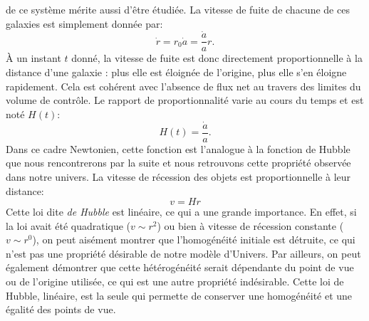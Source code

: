  de ce système mérite aussi d'être étudiée. La vitesse de fuite de chacune de ces galaxies est simplement donnée par:
\begin{equation}
\dot r= r_0 \dot a = \frac{\dot a}{a} r.
\end{equation}
À un instant $t$ donné, la vitesse de fuite est donc directement proportionnelle à la distance d'une galaxie : plus elle est éloignée de l'origine, plus elle s'en éloigne rapidement. Cela est cohérent avec l'absence de flux net au travers des limites du volume de contrôle. Le rapport de proportionnalité varie au cours du temps et est noté $H(t)$:
\begin{equation}
H(t)=\frac{\dot a}{a}.
\end{equation}
Dans ce cadre Newtonien, cette fonction est l'analogue à la fonction de Hubble  que nous rencontrerons par la suite et nous retrouvons cette propriété observée dans notre univers. La vitesse de récession des objets est proportionnelle à leur distance:
\begin{equation}
v=Hr
\label{e:hubblenewt}
\end{equation}
Cette loi dite \textit{de Hubble} est linéaire, ce qui a une grande importance. En effet, si la loi avait été quadratique ($v\sim r^2$) ou bien à vitesse de récession constante ($v\sim r^0$), on peut aisément montrer que l'homogénéité initiale est détruite, ce qui n'est pas une propriété désirable de notre modèle d'Univers. Par ailleurs, on peut également démontrer que cette hétérogénéité serait dépendante du point de vue ou de l'origine utilisée, ce qui est une autre propriété indésirable. Cette loi de Hubble, linéaire, est la seule qui permette de conserver une homogénéité et une égalité des points de vue.

